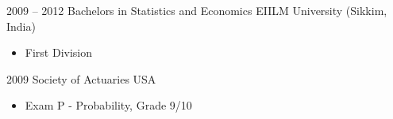 \documentclass[a4paper,]{fortysecondscv}
\begin{document}
\begin{cvtable}[2]
    \cvitem
    {2009 -- 2012}
    {Bachelors in Statistics and Economics}
    {EIILM University (Sikkim, India)}
    {
        \vspace{-\topsep}
        \begin{itemize}[nosep, leftmargin=0pt, label={}]
            \item First Division
        \end{itemize}
    }
    \cvitem
    {2009}
    {Society of Actuaries}
    {USA}
    {
        \vspace{-\topsep}
        \begin{itemize}[nosep, leftmargin=0pt, label={}]
            \item Exam P - Probability, Grade 9/10
        \end{itemize}
    }
\end{cvtable}
\end{document}
